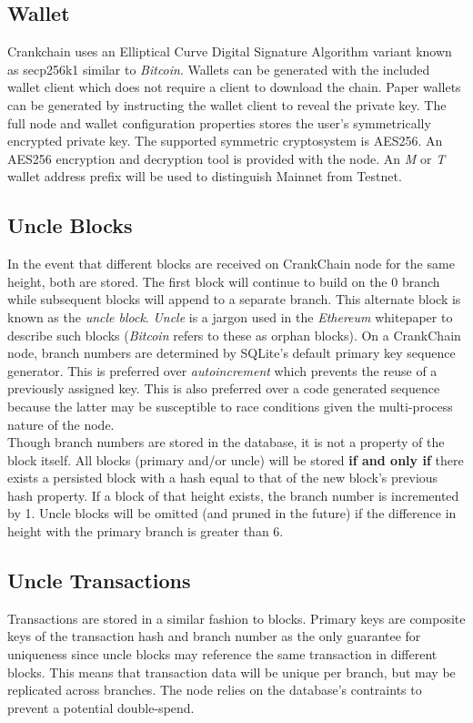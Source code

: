 \documentclass[10pt,twocolumn]{article}
\begin{document}
\subsection{Wallet}
Crankchain uses an Elliptical Curve Digital Signature Algorithm variant known as secp256k1 similar to \textit{Bitcoin}\cite{btcwiki:secp256k1}. Wallets can be generated with the included wallet client which does not require a client to download the chain.  Paper wallets can be generated by instructing the wallet client to reveal the private key.  The full node and wallet configuration properties stores the user's symmetrically encrypted private key.  The supported symmetric cryptosystem is AES256\cite{pub:aes}.  An AES256 encryption and decryption tool is provided with the node.  An \textit{M} or \textit{T} wallet address prefix will be used to distinguish Mainnet from Testnet.
\subsection{Uncle Blocks}
In the event that different blocks are received on  CrankChain node for the same height, both are stored.  The first block will continue to build on the 0 branch while subsequent blocks will append to a separate branch.  This alternate block is known as the \textit{uncle block}.  \textit{Uncle} is a jargon used in the \textit{Ethereum} whitepaper to describe such blocks (\textit{Bitcoin} refers to these as orphan blocks)\cite{whitepaper:buterin}\cite{conf:nakamoto}.  On a CrankChain node, branch numbers are determined by SQLite's default primary key sequence generator.  This is preferred over \textit{autoincrement} which prevents the reuse of a previously assigned key\cite{doc:sqliteautoinc}.  This is also preferred over a code generated sequence because the latter may be susceptible to race conditions given the multi-process nature of the node.\\
Though branch numbers are stored in the database, it is not a property of the block itself.  All blocks (primary and/or uncle) will be stored \textbf{if and only if} there exists a persisted block with a hash equal to that of the new block's previous hash property.  If a block of that height exists, the branch number is incremented by 1.  Uncle blocks will be omitted (and pruned in the future) if the difference in height with the primary branch is greater than 6.
\subsection{Uncle Transactions}
Transactions are stored in a similar fashion to blocks.  Primary keys are composite keys of the transaction hash and branch number as the only guarantee for uniqueness since uncle blocks may reference the same transaction in different blocks.  This means that transaction data will be unique per branch, but may be replicated across branches.  The node relies on the database's contraints to prevent a potential double-spend.
\end{document}
